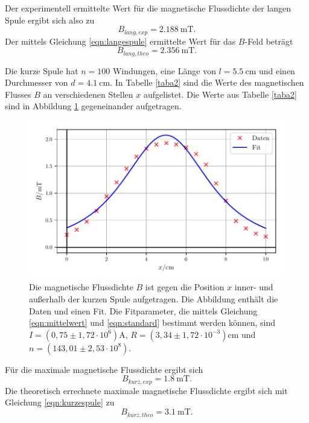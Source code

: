 \noindent Der experimentell ermittelte Wert für die 
magnetische Flussdichte der langen Spule ergibt sich also zu
\begin{equation*}
    B_{lang,exp} = \SI{2.188}{\milli\tesla}.
\end{equation*}
Der mittels Gleichung \eqref{eqn:langespule} ermittelte Wert für
das $B$-Feld beträgt
\begin{equation*}
    B_{lang,theo} = \SI{2.356}{\milli\tesla}.
\end{equation*}

\newpage %
\noindent Die kurze Spule hat $n = \num{100}$ Windungen, eine Länge von
$l = \SI{5.5}{\centi\meter}$ und einen Durchmesser von
$d = \SI{4.1}{\centi\meter}$.
In Tabelle \ref{taba2} sind die Werte des magnetischen Flusses $B$
an verschiedenen Stellen $x$ aufgelistet.
Die Werte aus Tabelle \ref{taba2} sind in Abbildung \ref{plota2}
gegeneinander aufgetragen.


\begin{figure}
    \centering
    \includegraphics{build/plota2.pdf}
    \caption{Die magnetische Flussdichte $B$ ist gegen die Position $x$ inner-
    und außerhalb der kurzen Spule aufgetragen. Die Abbildung enthält die Daten
    und einen Fit. Die Fitparameter, die mittels Gleichung \eqref{eqn:mittelwert} und \eqref{eqn:standard}
    bestimmt werden können, sind $I = (0,75 \pm 1,72 \cdot 10^6) \si{\ampere}$,
    $R = (3,34 \pm 1,72 \cdot 10^{-3}) \si{\centi\meter}$ und $n = (143,01 \pm 2,53 \cdot 10^8)$.}
    \label{plota2}
\end{figure}

\noindent Für die maximale magnetische Flussdichte ergibt sich 
\begin{equation*}
   B_{kurz,exp} = \SI{1.8}{\milli\tesla}.
\end{equation*}
Die theoretisch errechnete maximale magnetische Flussdichte
ergibt sich mit Gleichung \eqref{eqn:kurzespule} zu
\begin{equation*}
   B_{kurz,theo} = \SI{3.1}{\milli\tesla}.
\end{equation*}

